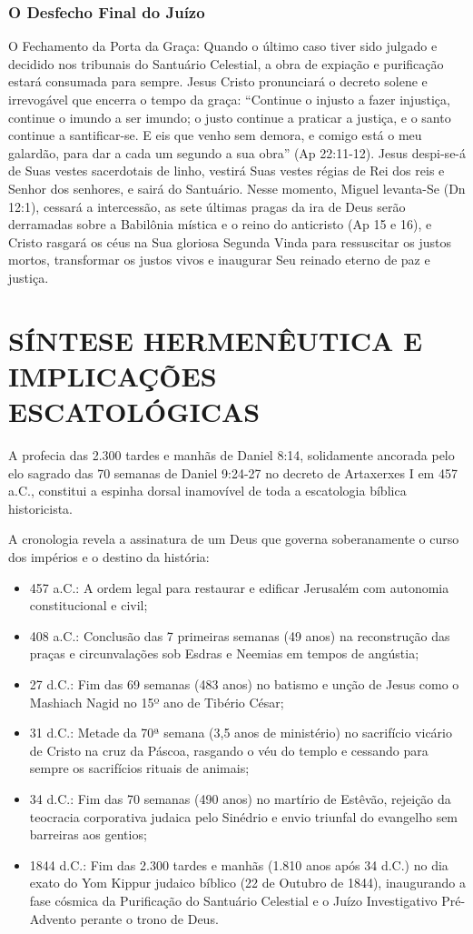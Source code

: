 \subsubsection*{O Desfecho Final do Juízo}
O Fechamento da Porta da Graça:
Quando o último caso tiver sido julgado e decidido nos tribunais do Santuário Celestial, a obra de expiação e purificação estará consumada para sempre. Jesus Cristo pronunciará o decreto solene e irrevogável que encerra o tempo da graça:
``Continue o injusto a fazer injustiça, continue o imundo a ser imundo; o justo continue a praticar a justiça, e o santo continue a santificar-se. E eis que venho sem demora, e comigo está o meu galardão, para dar a cada um segundo a sua obra'' (Ap 22:11-12).
Jesus despi-se-á de Suas vestes sacerdotais de linho, vestirá Suas vestes régias de Rei dos reis e Senhor dos senhores, e sairá do Santuário. Nesse momento, Miguel levanta-Se (Dn 12:1), cessará a intercessão, as sete últimas pragas da ira de Deus serão derramadas sobre a Babilônia mística e o reino do anticristo (Ap 15 e 16), e Cristo rasgará os céus na Sua gloriosa Segunda Vinda para ressuscitar os justos mortos, transformar os justos vivos e inaugurar Seu reinado eterno de paz e justiça.



\section{SÍNTESE HERMENÊUTICA E IMPLICAÇÕES ESCATOLÓGICAS}


A profecia das 2.300 tardes e manhãs de Daniel 8:14, solidamente ancorada pelo elo sagrado das 70 semanas de Daniel 9:24-27 no decreto de Artaxerxes I em 457 a.C., constitui a espinha dorsal inamovível de toda a escatologia bíblica historicista.

A cronologia revela a assinatura de um Deus que governa soberanamente o curso dos impérios e o destino da história:
\begin{itemize}
  \item 457 a.C.: A ordem legal para restaurar e edificar Jerusalém com autonomia constitucional e civil;
  \item 408 a.C.: Conclusão das 7 primeiras semanas (49 anos) na reconstrução das praças e circunvalações sob Esdras e Neemias em tempos de angústia;
  \item 27 d.C.: Fim das 69 semanas (483 anos) no batismo e unção de Jesus como o Mashiach Nagid no 15º ano de Tibério César;
  \item 31 d.C.: Metade da 70ª semana (3,5 anos de ministério) no sacrifício vicário de Cristo na cruz da Páscoa, rasgando o véu do templo e cessando para sempre os sacrifícios rituais de animais;
  \item 34 d.C.: Fim das 70 semanas (490 anos) no martírio de Estêvão, rejeição da teocracia corporativa judaica pelo Sinédrio e envio triunfal do evangelho sem barreiras aos gentios;
  \item 1844 d.C.: Fim das 2.300 tardes e manhãs (1.810 anos após 34 d.C.) no dia exato do Yom Kippur judaico bíblico (22 de Outubro de 1844), inaugurando a fase cósmica da Purificação do Santuário Celestial e o Juízo Investigativo Pré-Advento perante o trono de Deus.
\end{itemize}


